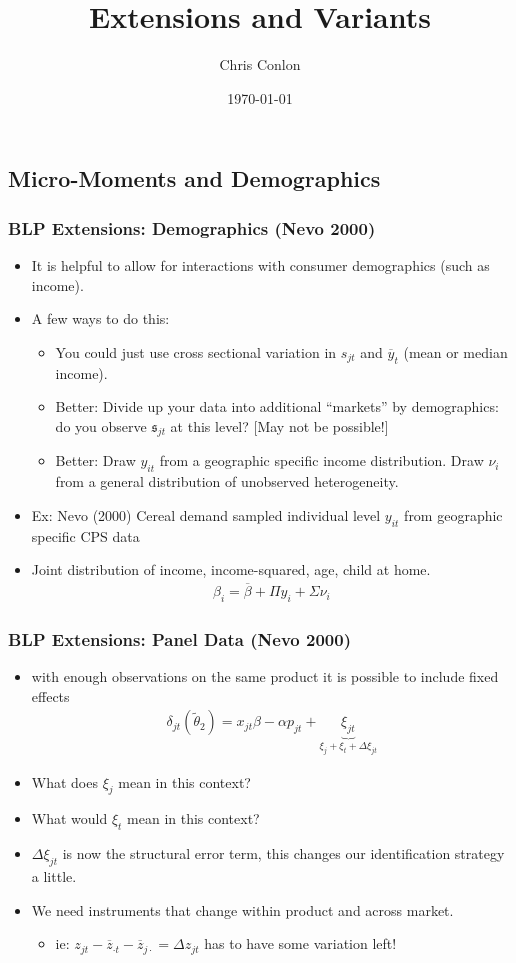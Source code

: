 \documentclass[xcolor=pdftex,dvipsnames,table,mathserif,aspectratio=169]{beamer}
\begin{document}
\title{Extensions and Variants}
\author{Chris Conlon}
\date{\today}

\frame{\titlepage}

\subsection*{Micro-Moments and Demographics}
\begin{frame}
\frametitle{BLP Extensions: Demographics (Nevo 2000)}
\begin{itemize}
\item It is helpful to allow for interactions with consumer demographics (such as income).
\item A few ways to do this:
\begin{itemize}
\item You could just use cross sectional variation in $s_{jt}$ and $\overline{y}_t$ (mean or median income).
\item Better: Divide up your data into additional ``markets'' by demographics: do you observe $\mathfrak{s}_{jt}$ at this level? [May not be possible!]
\item Better: Draw $y_{it}$ from a geographic specific income distribution. Draw $\nu_i$ from a general distribution of unobserved heterogeneity.
\end{itemize}
\item Ex: Nevo (2000) Cereal demand sampled individual level $y_{it}$ from geographic specific CPS data
\item Joint distribution of income, income-squared, age, child at home.
\begin{align*}
\beta_i = \overline{\beta} + \Pi y_i + \Sigma \nu_i
\end{align*}
\end{itemize}
\end{frame}

\begin{frame}
\frametitle{BLP Extensions: Panel Data (Nevo 2000)}
\begin{itemize}
\item with enough observations on the same product it is possible to include fixed effects
\begin{eqnarray*}
\delta_{jt}(\widetilde{\theta}_2) = x_{jt} \beta - \alpha p_{jt} + \underbrace{\xi_{jt}}_{\xi_{j} + \xi_t + \Delta \xi_{jt}}
\end{eqnarray*}
\item What does $\xi_{j}$ mean in this context?
\item What would $\xi_t$ mean in this context?
\item $\Delta \xi_{jt}$ is now the structural error term, this changes our identification strategy a little.
\item We need instruments that change \alert{within product and across market}.
\begin{itemize}
\item ie: $z_{jt} - \overline{z}_{\cdot t} - \overline{z}_{j \cdot } = \Delta z_{jt}$ has to have some variation left!
\end{itemize}
\end{itemize}
\end{frame}
\end{document}
